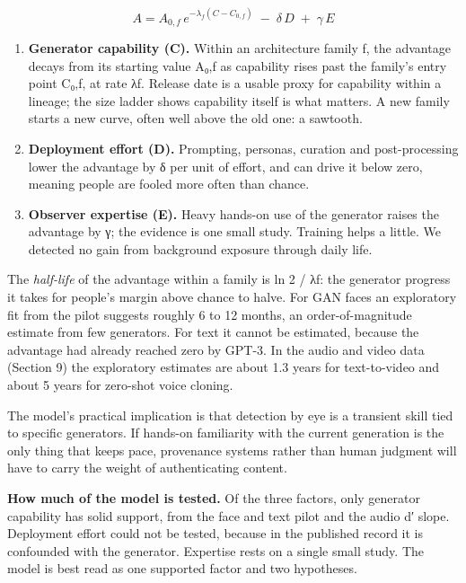 \documentclass[11pt]{article}
\providecommand{\tightlist}{\setlength{\itemsep}{0pt}\setlength{\parskip}{0pt}}
\begin{document}
\[A = A_{0,f}\, e^{-\lambda_f (C - C_{0,f})} \;-\; \delta\, D \;+\; \gamma\, E\]

\begin{enumerate}
\def\labelenumi{\arabic{enumi}.}
\tightlist
\item
  \textbf{Generator capability (C).} Within an architecture family f,
  the advantage decays from its starting value A₀,f as capability rises
  past the family's entry point C₀,f, at rate λf. Release date is a
  usable proxy for capability within a lineage; the size ladder shows
  capability itself is what matters. A new family starts a new curve,
  often well above the old one: a sawtooth.
\item
  \textbf{Deployment effort (D).} Prompting, personas, curation and
  post-processing lower the advantage by δ per unit of effort, and can
  drive it below zero, meaning people are fooled more often than chance.
\item
  \textbf{Observer expertise (E).} Heavy hands-on use of the generator
  raises the advantage by γ; the evidence is one small study. Training
  helps a little. We detected no gain from background exposure through
  daily life.
\end{enumerate}

The \emph{half-life} of the advantage within a family is ln 2 / λf: the
generator progress it takes for people's margin above chance to halve.
For GAN faces an exploratory fit from the pilot suggests roughly 6 to 12
months, an order-of-magnitude estimate from few generators. For text it
cannot be estimated, because the advantage had already reached zero by
GPT-3. In the audio and video data (Section 9) the exploratory estimates
are about 1.3 years for text-to-video and about 5 years for zero-shot
voice cloning.

The model's practical implication is that detection by eye is a
transient skill tied to specific generators. If hands-on familiarity
with the current generation is the only thing that keeps pace,
provenance systems rather than human judgment will have to carry the
weight of authenticating content.

\textbf{How much of the model is tested.} Of the three factors, only
generator capability has solid support, from the face and text pilot and
the audio d′ slope. Deployment effort could not be tested, because in
the published record it is confounded with the generator. Expertise
rests on a single small study. The model is best read as one supported
factor and two hypotheses.
\end{document}
